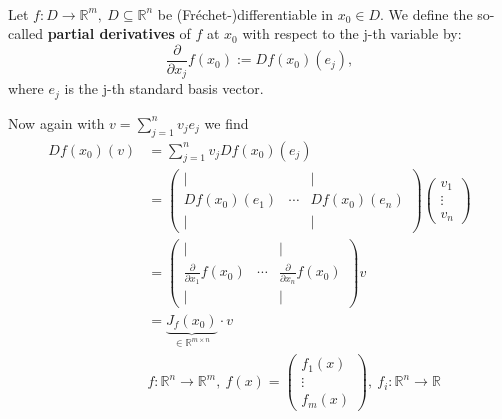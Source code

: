 \begin{frame}
~\\
\begin{definition}
	Let $f:D\rightarrow\mathbb{R}^m,~D\subseteq\mathbb{R}^n$ be (Fréchet-)differentiable in $x_0\in D$. We define the so-called \textbf{partial derivatives} of $f$ at $x_0$ with respect to the j-th variable by:
	$$
	\frac{\partial}{\partial x_j}f(x_0):=Df(x_0)(e_j),
	$$
	where $e_j$ is the j-th standard basis vector.
\end{definition}
{
Now again with $v=\sum_{j=1}^n v_je_j$ we find
\begin{align*}
Df(x_0)(v)&=\sum_{j=1}^n v_j Df(x_0)(e_j)\\
&=\begin{pmatrix}
|&~&|\\
Df(x_0)(e_1)&\cdots&Df(x_0)(e_n)\\
|&~&|
\end{pmatrix}\begin{pmatrix}
v_1\\\vdots\\v_n
\end{pmatrix}\\
&=\begin{pmatrix}
|&~&|\\
\frac{\partial}{\partial x_1}f(x_0)&\cdots&\frac{\partial}{\partial x_n}f(x_0)\\
|&~&|
\end{pmatrix}v\\
&=\underbrace{J_f(x_0)}_{\in\mathbb{R}^{m\times n}}\cdot v\\
&f:\mathbb{R}^n\rightarrow\mathbb{R}^m,~f(x)=\begin{pmatrix}
f_1(x)\\\vdots\\f_m(x)
\end{pmatrix},~f_i:\mathbb{R}^n\rightarrow\mathbb{R}
\end{align*}
}
\end{frame}

